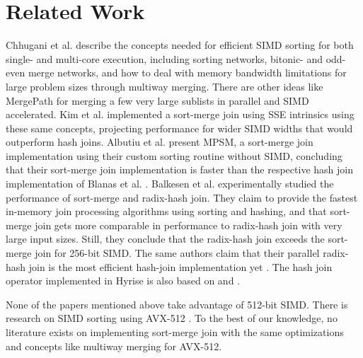 \section{Related Work}
\label{sec:related-work}


Chhugani et al. \cite{10.14778/1454159.1454171} describe the concepts 
needed for efficient SIMD sorting for both single- and multi-core execution, including sorting
networks, bitonic- and odd-even merge networks, and how to deal with memory bandwidth limitations 
for large problem sizes through multiway merging. There are other ideas like MergePath \cite{MergePath}
for merging a few very large sublists in parallel and SIMD accelerated.
Kim et al. \cite{10.14778/1687553.1687564} implemented a sort-merge join using SSE intrinsics using these same 
concepts, projecting performance for wider SIMD widths that would outperform hash joins. Albutiu 
et al. \cite{MPSM} present MPSM, a sort-merge join implementation using their custom sorting routine
without SIMD, concluding that their sort-merge join
implementation is faster than the respective hash join implementation of Blanas et al. \cite{10.1145/1989323.1989328}. 
Balkesen et al. \cite{Balkesen} experimentally studied the performance of sort-merge and radix-hash join.
They claim to provide the fastest in-memory join processing algorithms using sorting and hashing,
and that sort-merge join gets more comparable in performance to radix-hash join with very large 
input sizes. Still, they conclude that the radix-hash join exceeds the sort-merge join for 256-bit
SIMD. The same authors claim that their parallel radix-hash join is the most efficient hash-join
implementation yet \cite{6544839}. The hash join operator
implemented in Hyrise is also based on \cite{6544839} and \cite{Balkesen}. 

None of the papers mentioned above take advantage of 512-bit SIMD. 
There is research on SIMD sorting using AVX-512 \cite{Watkins, 8855628}. To the best of our knowledge,
no literature exists on implementing sort-merge join with the same optimizations and concepts like
multiway merging for AVX-512. 

